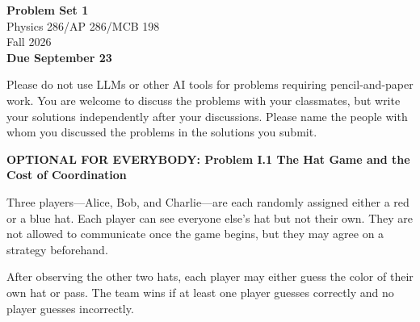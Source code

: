 \documentclass[11pt]{article}
\newcommand{\problem}[1]{%
    \vspace{1em}
    {\large\bfseries #1}
    \par
    \vspace{0.4em}
}
\begin{document}
\begin{center}
    {\LARGE \textbf{Problem Set 1}}\\[0.4em]
    {\large Physics 286/AP 286/MCB 198}\\[0.25em]
    {\large Fall 2026}\\[0.4em]
    {\large \textbf{Due September 23}}
\end{center}

\vspace{0.8em}

Please do not use LLMs or other AI tools for problems requiring
pencil-and-paper work. You are welcome to discuss the problems with your
classmates, but write your solutions independently after your discussions.
Please name the people with whom you discussed the problems in the solutions
you submit.


\problem{OPTIONAL FOR EVERYBODY: Problem I.1 The Hat Game and the Cost of Coordination}

Three players---Alice, Bob, and Charlie---are each randomly assigned either
a red or a blue hat. Each player can see everyone else's hat but not their
own. They are not allowed to communicate once the game begins, but they may
agree on a strategy beforehand.

After observing the other two hats, each player may either guess the color
of their own hat or pass. The team wins if at least one player guesses
correctly and no player guesses incorrectly.
\end{document}
